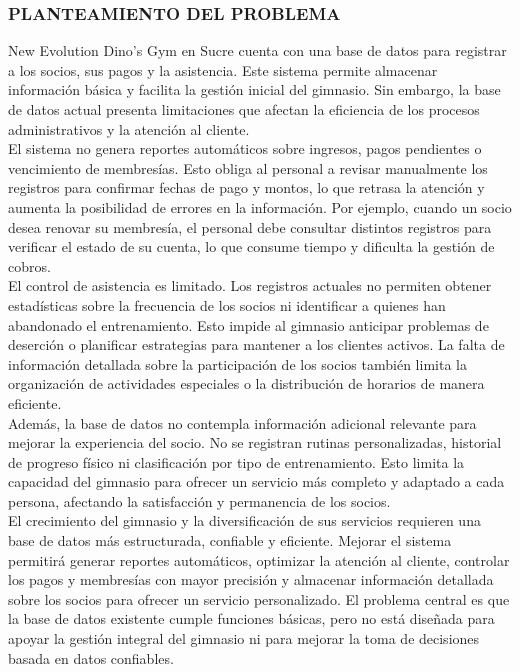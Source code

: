 \documentclass[12pt, letterpaper]{article}
\begin{document}
\subsubsection{PLANTEAMIENTO DEL PROBLEMA}
New Evolution Dino's Gym en Sucre cuenta con una base de datos para registrar a los socios, sus pagos y la asistencia. Este sistema permite almacenar información básica y facilita la gestión inicial del gimnasio. Sin embargo, la base de datos actual presenta limitaciones que afectan la eficiencia de los procesos administrativos y la atención al cliente.\\
El sistema no genera reportes automáticos sobre ingresos, pagos pendientes o vencimiento de membresías. Esto obliga al personal a revisar manualmente los registros para confirmar fechas de pago y montos, lo que retrasa la atención y aumenta la posibilidad de errores en la información. Por ejemplo, cuando un socio desea renovar su membresía, el personal debe consultar distintos registros para verificar el estado de su cuenta, lo que consume tiempo y dificulta la gestión de cobros.\\
El control de asistencia es limitado. Los registros actuales no permiten obtener estadísticas sobre la frecuencia de los socios ni identificar a quienes han abandonado el entrenamiento. Esto impide al gimnasio anticipar problemas de deserción o planificar estrategias para mantener a los clientes activos. La falta de información detallada sobre la participación de los socios también limita la organización de actividades especiales o la distribución de horarios de manera eficiente.\\
Además, la base de datos no contempla información adicional relevante para mejorar la experiencia del socio. No se registran rutinas personalizadas, historial de progreso físico ni clasificación por tipo de entrenamiento. Esto limita la capacidad del gimnasio para ofrecer un servicio más completo y adaptado a cada persona, afectando la satisfacción y permanencia de los socios.\\
El crecimiento del gimnasio y la diversificación de sus servicios requieren una base de datos más estructurada, confiable y eficiente. Mejorar el sistema permitirá generar reportes automáticos, optimizar la atención al cliente, controlar los pagos y membresías con mayor precisión y almacenar información detallada sobre los socios para ofrecer un servicio personalizado. El problema central es que la base de datos existente cumple funciones básicas, pero no está diseñada para apoyar la gestión integral del gimnasio ni para mejorar la toma de decisiones basada en datos confiables.\\
\end{document}

